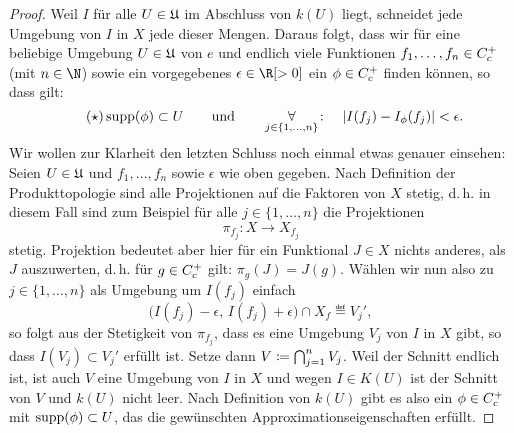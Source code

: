 \begin{proof}
    Weil $I$ für alle $U\in\mathfrak{U}$ im Abschluss von $k(U)$ 
    liegt, schneidet jede Umgebung von $I$ in $X$ jede dieser Mengen.
    Daraus folgt, dass wir für eine beliebige Umgebung $U\in\mathfrak{U}$ von $e$ und
    endlich viele Funktionen $f_1,\ldots,f_n\in C_c^+$ (mit $n\in\N$)
    sowie ein vorgegebenes $\epsilon\in\R[>0]$ ein $\phi\in C_c^+$ finden
    können, so dass gilt:
    \[ \label{pf:existence:ineq} \tag{$\star$}
        \operatorname{supp}(\phi) \subset U \qquad\text{und}\qquad
        \operatorname*{\forall}_{j\in\{1,\ldots,n\}}\colon\quad 
            \lvert I(f_j) - I_\phi(f_j) \rvert < \epsilon
    . \]
    Wir wollen zur Klarheit den letzten Schluss noch einmal etwas genauer
    einsehen: Seien $U\in\mathfrak{U}$ und $f_1,\ldots,f_n$ sowie $\epsilon$ wie oben
    gegeben. Nach Definition der Produkttopologie sind alle Projektionen
    auf die Faktoren von $X$ stetig, d.\,h. in diesem Fall sind zum Beispiel für
    alle $j\in\{1,\ldots,n\}$ die Projektionen
    \[ \pi_{f_j}\colon X \to X_{f_j} \]
    stetig. Projektion bedeutet aber hier für ein Funktional $J\in X$ nichts
    anderes, als $J$ auszuwerten, d.\,h. für $g\in C_c^+$ gilt:
    $\pi_g(J) = J(g)$. Wählen wir nun also zu $j\in\{1,\ldots,n\}$ als Umgebung
    um $I(f_j)$ einfach  
    \[
        \bigl( I(f_j)-\epsilon,\, I(f_j)+\epsilon \bigr) \cap X_f \eqdef V_j'
    , \]
    so folgt aus der Stetigkeit von $\pi_{f_j}$, dass es eine Umgebung $V_j$ von
    $I$ in $X$ gibt, so dass $I(V_j) \subset V_j'$ erfüllt ist. Setze dann 
    $V\coloneqq \bigcap_{j=1}^n V_j$. Weil der Schnitt endlich ist, ist auch $V$
    eine Umgebung von $I$ in $X$ und wegen $I\in K(U)$ ist der Schnitt von $V$
    und $k(U)$ nicht leer. Nach Definition von $k(U)$ gibt es also
    ein $\phi\in C_c^+$ mit $\operatorname{supp}(\phi)\subset U$, das die gewünschten
    Approximationseigenschaften erfüllt.
    

\end{proof}
